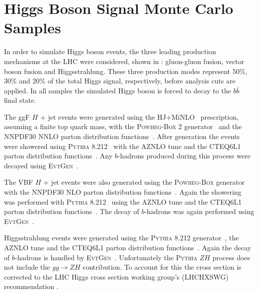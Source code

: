 \section{Higgs Boson Signal Monte Carlo Samples} \label{sec:data:signal_mc}

In order to simulate Higgs boson events, the three leading production
mechanisms at the LHC were considered, shown in :
gluon-gluon fusion, vector boson fusion and Higgsstrahlung.  These three
production modes represent 50\%, 30\% and 20\% of the total Higgs signal,
respectively, before analysis cuts are applied.  In all samples the simulated
Higgs boson is forced to decay to the $b\bar{b}$ final state.

The ggF $H$ + jet events were generated using the HJ+MiNLO~\cite{Hamilton2015}
prescription, assuming a finite top quark mass, with the \textsc{Powheg-Box} 2
generator~\cite{Campbell2012} and the NNPDF30 NNLO parton distribution
functions~\cite{Hamilton:2012rf}.  After generation the events were showered
using \textsc{Pythia} 8.212~\cite{Sjostrand:2014zea} with the AZNLO tune and
the CTEQ6L1 parton distribution functions~\cite{Pumplin:2002vw}. Any
$b$-hadrons produced during this process were decayed using
\textsc{EvtGen}~\cite{LANGE2001152}.

The VBF $H$ + jet events were also generated using the \textsc{Powheg-Box}
generator~\cite{Nason:2009ai} with the NNPDF30 NLO parton distribution
functions~\cite{Hamilton:2012rf}. Again the showering was performed with
\textsc{Pythia} 8.212~\cite{Sjostrand:2014zea} using the AZNLO tune and the
CTEQ6L1 parton distribution functions~\cite{Pumplin:2002vw}.  The decay of
$b$-hadrons was again performed using \textsc{EvtGen}~\cite{LANGE2001152}.

Higgsstrahlung events were generated using the \textsc{Pythia} 8.212
generator~\cite{Sjostrand:2014zea}, the AZNLO tune and the CTEQ6L1 parton
distribution functions~\cite{Pumplin:2002vw}.  Again the decay of $b$-hadrons
is handled by \textsc{EvtGen}~\cite{LANGE2001152}. Unfortunately the
\textsc{Pythia} $ZH$ process does not include the $gg \rightarrow ZH$
contribution.  To account for this the cross section is corrected to the LHC
Higgs cross section working group's (LHCHXSWG) recommendation
\cite{MelladoGarcia:2150771}.
